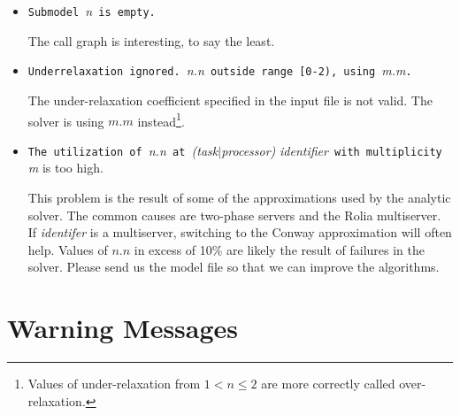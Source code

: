 \begin{itemize}
\item \texttt{Submodel }\emph{n}\texttt{ is empty.}
  
  The call graph is interesting, to say the least.

\item \texttt{Underrelaxation ignored.  }\emph{n.n}\texttt{ outside
    range [0-2), using }\emph{m.m}\texttt{.}
  
  The under-relaxation
  coefficient specified in
  the input file is not valid.  The solver is using $m.m$
  instead\footnote{Values of under-relaxation from $1 < n \le 2$ are
    more correctly called over-relaxation.}.

\item \texttt{The utilization of }\emph{n.n}\texttt{ at }\emph{(task$|$processor)}
  \emph{identifier}\texttt{ with multiplicity }\emph{m}{ is too high.}
  
  This problem is the result of some of the approximations
  used by the analytic solver.  The
  common causes are two-phase
  servers and the Rolia
  multiserver.
  If \emph{identifer} is a multiserver, switching to the
  Conway approximation will often help.
  Values of $n.n$ in excess of 10\% are likely the result of failures
  in the solver.  Please send us the model file so that we can improve
  the algorithms.

\end{itemize}

\section{Warning Messages}
\label{sec:warning-messages}

